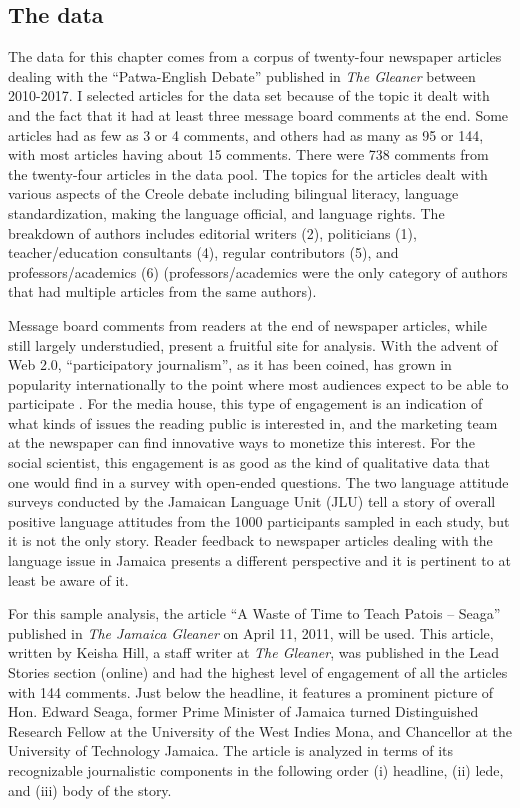 \documentclass[output=paper,colorlinks,citecolor=brown]{langscibook}
\begin{document}
\subsection{The data}
\largerpage
The data for this chapter comes from a corpus of twenty-four newspaper articles dealing with the “Patwa-English Debate” published in \textit{The Gleaner} between 2010-2017. I selected articles for the data set because of the topic it dealt with and the fact that it had at least three message board comments at the end. Some articles had as few as 3 or 4 comments, and others had as many as 95 or 144, with most articles having about 15 comments. There were 738 comments from the twenty-four articles in the data pool. The topics for the articles dealt with various aspects of the Creole debate including bilingual literacy, language standardization, making the language official, and language rights. The breakdown of authors includes editorial writers (2), politicians (1), teacher\slash education consultants (4), regular contributors (5), and professors\slash academics (6) (professors\slash academics were the only category of authors that had multiple articles from the same authors). 

Message board comments from readers at the end of newspaper articles, while still largely understudied, present a fruitful site for analysis. With the advent of Web 2.0, “participatory journalism”, as it has been coined, has grown in popularity internationally \citep{Reich2011,HermidaThurman2008,Ornebring2008} to the point where most audiences expect to be able to participate \citep{Jenkins2008}. For the media house, this type of engagement is an indication of what kinds of issues the reading public is interested in, and the marketing team at the newspaper can find innovative ways to monetize this interest. For the social scientist, this engagement is as good as the kind of qualitative data that one would find in a survey with open-ended questions. The two language attitude surveys conducted by the Jamaican Language Unit (JLU) tell a story of overall positive language attitudes from the 1000 participants sampled in each study, but it is not the only story. Reader feedback to newspaper articles dealing with the language issue in Jamaica presents a different perspective and it is pertinent to at least be aware of it.

For this sample analysis, the article “A Waste of Time to Teach Patois -- Seaga” published in \textit{The Jamaica Gleaner} on April 11, 2011, will be used. This article, written by Keisha Hill, a staff writer at \textit{The Gleaner}, was published in the Lead Stories section (online) and had the highest level of engagement of all the articles with 144 comments. Just below the headline, it features a prominent picture of Hon. Edward Seaga, former Prime Minister of Jamaica turned Distinguished Research Fellow at the University of the West Indies Mona, and Chancellor at the University of Technology Jamaica. The article is analyzed in terms of its recognizable journalistic components in the following order (i) headline, (ii) lede, and (iii) body of the story.
\end{document}
